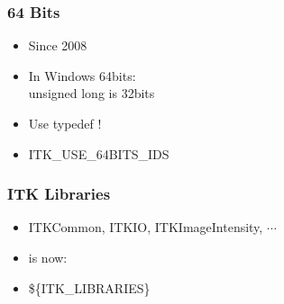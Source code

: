 

{
\begin{frame}
\frametitle{64 Bits}
\Huge
\begin{itemize}
\item Since 2008
\item In Windows 64bits:\\unsigned long is 32bits
\item Use typedef !
\item ITK\_USE\_64BITS\_IDS
\end{itemize}
\end{frame}
}


{
\begin{frame}
\frametitle{ITK Libraries}
\Huge
\begin{itemize}
\item ITKCommon, ITKIO, ITKImageIntensity, $\cdots$
\item is now:
\item \$\{ITK\_LIBRARIES\}
\end{itemize}
\end{frame}
}


